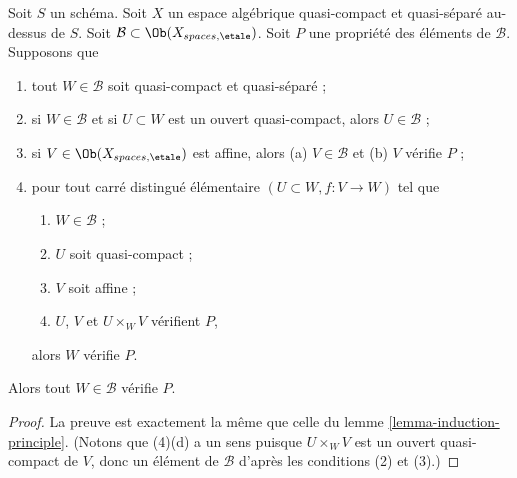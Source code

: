 \begin{lemma}
\label{lemma-induction-principle-separated}
Soit $S$ un schéma. Soit $X$ un espace algébrique quasi-compact et quasi-séparé
au-dessus de $S$. Soit
$\mathcal{B} \subset \Ob(X_{spaces, \etale})$.
Soit $P$ une propriété des éléments de $\mathcal{B}$.
Supposons que
\begin{enumerate}
\item tout $W \in \mathcal{B}$ soit quasi-compact et quasi-séparé ;
\item si $W \in \mathcal{B}$ et si $U \subset W$ est un ouvert quasi-compact, alors
$U \in \mathcal{B}$ ;
\item si $V \in \Ob(X_{spaces, \etale})$ est affine, alors
(a) $V \in \mathcal{B}$ et (b) $V$ v\'erifie $P$ ;
\item pour tout carré distingué élémentaire $(U \subset W, f : V \to W)$
tel que
\begin{enumerate}
\item $W \in \mathcal{B}$ ;
\item $U$ soit quasi-compact ;
\item $V$ soit affine ;
\item $U$, $V$ et $U \times_W V$ v\'erifient $P$,
\end{enumerate}
alors $W$ v\'erifie $P$.
\end{enumerate}
Alors tout $W \in \mathcal{B}$ v\'erifie $P$.
\end{lemma}

\begin{proof}
La preuve est exactement la même que celle du
lemme \ref{lemma-induction-principle}.
(Notons que (4)(d) a un sens puisque $U \times_W V$ est un ouvert
quasi-compact de $V$, donc un élément de $\mathcal{B}$ d'après les conditions
(2) et (3).)
\end{proof}

